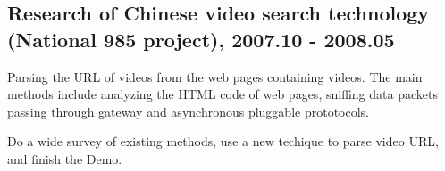 \documentclass[letterpaper]{article}
\renewenvironment{itemize}{
  \begin{list}{}{
    \setlength{\leftmargin}{1.5em}
    \setlength{\itemsep}{0pt}
  }
}{
  \end{list}
}
\begin{document}
\subsection*{Research of Chinese video search technology (National 985 project), 2007.10 - 2008.05}
\begin{itemize}
\item Parsing the URL of videos from the web pages containing videos. The main methods include analyzing the HTML code of web pages, sniffing data packets passing through gateway and asynchronous pluggable prototocols.
\item Do a wide survey of existing methods, use a new techique to parse video URL, and finish the Demo.
\end{itemize}

%
\end{document}
